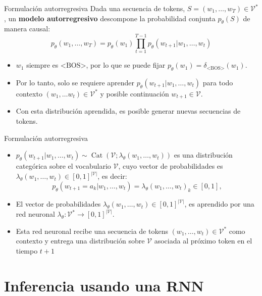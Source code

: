 \documentclass{beamer}
\begin{document}
\begin{frame}{Formulación autorregresiva}
    Dada una secuencia de tokens, $S=(w_1,\ldots,w_T)\in\mathcal{V}^*$, un \textbf{modelo autorregresivo} descompone la probabilidad conjunta $p_\theta(S)$ de manera causal:
    \begin{equation*}
        p_\theta(w_1,\ldots,w_T)=p_\theta(w_1)\prod_{t=1}^{T-1} p_\theta(w_{t+1}|w_1,\ldots,w_t)
    \end{equation*}
    \begin{itemize}
        \item $w_1$ siempre es $\text{<BOS>}$, por lo que se puede fijar $p_\theta(w_1)=\delta_{\text{<BOS>}}(w_1)$.
        \item Por lo tanto, solo se requiere aprender $p_\theta(w_{t+1}|w_1,\ldots,w_t)$ para todo contexto $(w_1,\ldots w_t)\in\mathcal{V}^*$ y posible continuación $w_{t+1}\in\mathcal{V}$.
        \item Con esta distribución aprendida, es posible generar nuevas secuencias de tokens.
    \end{itemize}
\end{frame}

\begin{frame}{Formulación autorregresiva}
    \begin{itemize}
        \item $p_\theta(w_{t+1}|w_1,\ldots,w_t)\sim\operatorname{Cat}\left(\mathcal{V};\lambda_\theta(w_1,\ldots,w_t)\right)$ es una distribución categórica sobre el vocabulario $\mathcal{V}$, cuyo vector de probabilidades es $\lambda_\theta(w_1,\ldots,w_t)\in[0,1]^{|\mathcal{V}|}$, es decir:
              \begin{equation*}
                  p_\theta(w_{t+1}=a_k|w_1,\ldots,w_t)=\lambda_\theta(w_1,\ldots,w_t)_k\in[0,1],
              \end{equation*}
        \item El vector de probabilidades $\lambda_\theta(w_1,\ldots,w_t)\in[0,1]^{|\mathcal{V}|}$, es  aprendido por una red neuronal $\lambda_\theta:\mathcal{V}^*\to[0,1]^{|\mathcal{V}|}$.
        \item Esta red neuronal recibe una secuencia de tokens $(w_1,\ldots,w_t)\in\mathcal{V}^*$ como contexto y entrega una distribución sobre $\mathcal{V}$ asociada al próximo token en el tiempo $t+1$
    \end{itemize}
\end{frame}

\section{Inferencia usando una RNN}
\end{document}
